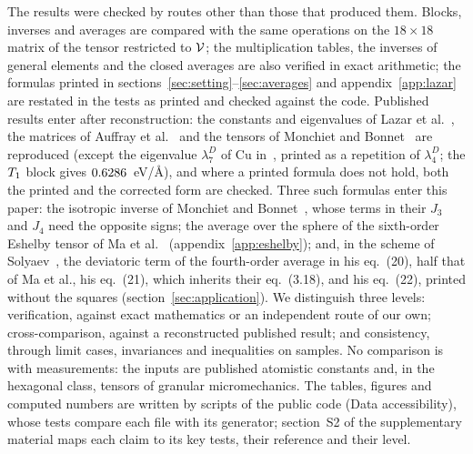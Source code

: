 The results were checked by routes other than those that produced them. Blocks, inverses
and averages are compared with the same operations on the $18\times18$ matrix of the
tensor restricted to $\mathcal{V}$; the multiplication tables, the inverses of general elements
and the closed averages are also verified in exact arithmetic; the formulas printed in
sections~\ref{sec:setting}--\ref{sec:averages} and appendix~\ref{app:lazar} are restated
in the tests as printed and checked against the code. Published results enter after reconstruction: the constants
and eigenvalues of Lazar et al.~\cite{Lazar2022}, the matrices of Auffray
et al.~\cite{Auffray2013} and the tensors of Monchiet and Bonnet~\cite{Monchiet2011a,Monchiet2013}
are reproduced (except the eigenvalue $\lambda_7^D$ of Cu in~\cite[table~5]{Lazar2022},
printed as a repetition of $\lambda_4^D$; the $T_1$ block gives
$0.6286$~eV/\AA), and where a printed formula does not hold, both the printed and the
corrected form are checked. Three such formulas enter this paper: the isotropic inverse of
Monchiet and Bonnet~\cite[eq.~(2.13)]{Monchiet2011a}, whose terms in their $J_3$ and $J_4$
need the opposite signs; the average over the sphere of the sixth-order Eshelby tensor of
Ma et al.~\cite[eq.~(3.18)]{Ma2018} (appendix~\ref{app:eshelby}); and, in the scheme of
Solyaev~\cite{Solyaev2023}, the deviatoric term of the fourth-order average in his eq.~(20),
half that of Ma et al., his eq.~(21), which inherits their eq.~(3.18), and his eq.~(22), printed without the
squares (section~\ref{sec:application}). We distinguish three levels: verification, against exact
mathematics or an independent route of our own; cross-comparison, against a
reconstructed published result; and consistency, through limit cases, invariances and
inequalities on samples. No comparison is with measurements: the inputs are published
atomistic constants and, in the hexagonal class, tensors of granular micromechanics. The tables, figures and
computed numbers are written by scripts of the public code (Data accessibility), whose
tests compare each file with its generator; section~S2 of the supplementary material
maps each claim to its key tests, their reference and their level.

\begin{table}[pos=tbp]
\caption{Block moduli~\eqref{eq:cub-tensor} of the five cubic data sets (eV/\AA), from
the MEAM constants of Lazar et al.~\cite[table~1]{Lazar2022} and the EAM constants of
Po et al.~\cite[table~1]{Po2019} by~\eqref{eq:cub-lazar}; for Al and Cu MEAM each entry
is taken from the finer of the two printings. Last rows: positive
definiteness, with the failing block, and condition number of $\tD$ (largest eigenvalue over
smallest eigenvalue modulus). The last digit shown is uncertain by at most five units
given the precision of the published constants; $\dagger$ marks the entries whose
relative uncertainty exceeds 1\,\%, here the $m_E$ of Cu MEAM ($\pm\NumCuMEAMmERoundingPercent\,\%$)
and the condition number it sets. The Cu EAM constants obey the relations
$D_{2,4}=D_{3,5}$ and $D_{2,5}=D_{16,17}$ that Admal et al.~\cite{Admal2017} find for
pair functionals, that is, $a_3=4a_2$ and $a_1=a_5$.}\label{tab:block-moduli}
\centering\small

\end{table}
